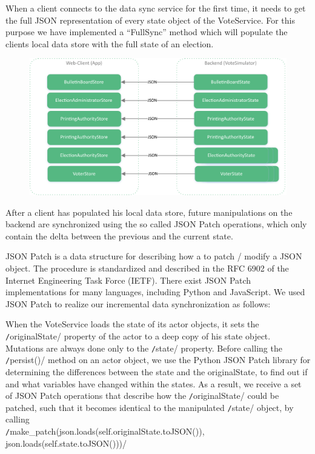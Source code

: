 When a client connects to the data sync service for the first time, it needs to get the full JSON representation of every state object of the VoteService. For this purpose we have implemented a "`FullSync"' method which will populate the clients local data store with the full state of an election.

\begin{figure}
\begin{center}
\includegraphics[scale=0.62]{assets/datastores.pdf}
\label{Datastores}%
\end{center}
\end{figure}
After a client has populated his local data store, future manipulations on the backend are synchronized using the so called JSON Patch operations, which only contain the delta between the previous and the current state.

JSON Patch is a data structure for describing how a to patch / modify a JSON object. The procedure is standardized and described in the RFC 6902 of the Internet Engineering Task Force (IETF). There exist JSON Patch implementations for many languages, including Python and JavaScript. We used JSON Patch to realize our incremental data synchronization as follows:

When the VoteService loads the state of its actor objects, it sets the \texttt/originalState/ property of the actor to a deep copy of his state object. Mutations are always done only to the \texttt/state/ property. Before calling the \texttt/persist()/ method on an actor object, we use the Python JSON Patch library for determining the differences between the state and the originalState, to find out if and what variables have changed within the states. As a result, we receive a set of JSON Patch operations that describe how the \texttt/originalState/ could be patched, such that it becomes identical to the manipulated \texttt/state/ object, by calling 
\\ \texttt/make_patch(json.loads(self.originalState.toJSON()), json.loads(self.state.toJSON()))/

